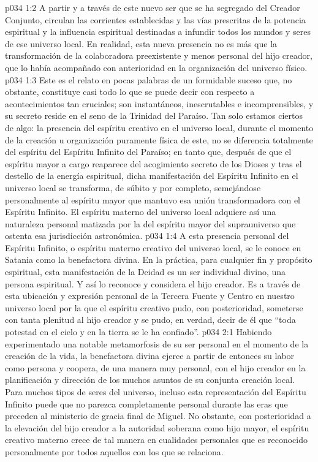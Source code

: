 \vs p034 1:2 A partir y a través de este nuevo ser que se ha segregado del Creador Conjunto, circulan las corrientes establecidas y las vías prescritas de la potencia espiritual y la influencia espiritual destinadas a infundir todos los mundos y seres de ese universo local. En realidad, esta nueva presencia no es más que la transformación de la colaboradora preexistente y menos personal del hijo creador, que lo había acompañado con anterioridad en la organización del universo físico.
\vs p034 1:3 \pc Este es el relato en pocas palabras de un formidable suceso que, no obstante, constituye casi todo lo que se puede decir con respecto a acontecimientos tan cruciales; son instantáneos, inescrutables e incomprensibles, y su secreto reside en el seno de la Trinidad del Paraíso. Tan solo estamos ciertos de algo: la presencia del espíritu creativo en el universo local, durante el momento de la creación u organización puramente física de este, no se diferencia totalmente del espíritu del Espíritu Infinito del Paraíso; en tanto que, después de que el espíritu mayor a cargo reaparece del acogimiento secreto de los Dioses y tras el destello de la energía espiritual, dicha manifestación del Espíritu Infinito en el universo local se transforma, de súbito y por completo, semejándose personalmente al espíritu mayor que mantuvo esa unión transformadora con el Espíritu Infinito. El espíritu materno del universo local adquiere así una naturaleza personal matizada por la del espíritu mayor del suprauniverso que ostenta esa jurisdicción astronómica.
\vs p034 1:4 A esta presencia personal del Espíritu Infinito, o espíritu materno creativo del universo local, se le conoce en Satania como la benefactora divina. En la práctica, para cualquier fin y propósito espiritual, esta manifestación de la Deidad es un ser individual divino, una persona espiritual. Y así lo reconoce y considera el hijo creador. Es a través de esta ubicación y expresión personal de la Tercera Fuente y Centro en nuestro universo local por la que el espíritu creativo pudo, con posterioridad, someterse con tanta plenitud al hijo creador y se pudo, en verdad, decir de él que “toda potestad en el cielo y en la tierra se le ha confiado”.
\vs p034 2:1 Habiendo experimentado una notable metamorfosis de su ser personal en el momento de la creación de la vida, la benefactora divina ejerce a partir de entonces su labor como persona y coopera, de una manera muy personal, con el hijo creador en la planificación y dirección de los muchos asuntos de su conjunta creación local. Para muchos tipos de seres del universo, incluso esta representación del Espíritu Infinito puede que no parezca completamente personal durante las eras que preceden al ministerio de gracia final de Miguel. No obstante, con posterioridad a la elevación del hijo creador a la autoridad soberana como hijo mayor, el espíritu creativo materno crece de tal manera en cualidades personales que es reconocido personalmente por todos aquellos con los que se relaciona.

